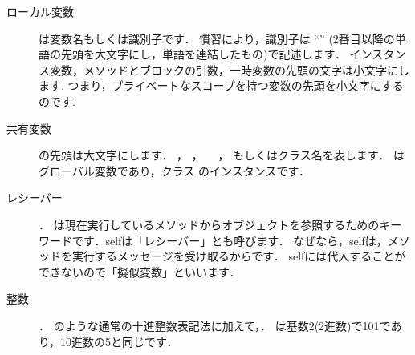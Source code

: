 \documentclass[a4paper,10pt,twoside]{book}
\begin{document}
\begin{description}
\item[ローカル変数]  は変数名もしくは識別子です．
		慣習により，識別子は ``'' (\ie 2番目以降の単語の先頭を大文字にし，単語を連結したもの)で記述します．
		インスタンス変数，メソッドとブロックの引数，一時変数の先頭の文字は小文字にします.
		つまり，プライベートなスコープを持つ変数の先頭を小文字にするのです.

\item[共有変数] の先頭は大文字にします． ，  ， 　， もしくはクラス名を表します．
		 はグローバル変数であり，クラス  のインスタンスです．

\item[レシーバー]．  は現在実行しているメソッドからオブジェクトを参照するためのキーワードです．selfは「レシーバー」とも呼びます．
なぜなら，selfは，メソッドを実行するメッセージを受け取るからです．
selfには代入することができないので「擬似変数」といいます．

\item[整数]． のような通常の十進整数表記法に加えて，．
は基数2(\ie 2進数)で101であり，10進数の5と同じです．


\end{description}
\end{document}
